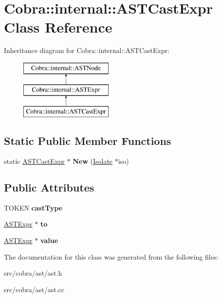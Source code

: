 \hypertarget{class_cobra_1_1internal_1_1_a_s_t_cast_expr}{\section{Cobra\+:\+:internal\+:\+:A\+S\+T\+Cast\+Expr Class Reference}
\label{class_cobra_1_1internal_1_1_a_s_t_cast_expr}
}
Inheritance diagram for Cobra\+:\+:internal\+:\+:A\+S\+T\+Cast\+Expr\+:\begin{figure}[H]
\begin{center}
\leavevmode
\includegraphics[height=3.000000cm]{class_cobra_1_1internal_1_1_a_s_t_cast_expr}
\end{center}
\end{figure}
\subsection*{Static Public Member Functions}
\begin{DoxyCompactItemize}
\item 
\hypertarget{class_cobra_1_1internal_1_1_a_s_t_cast_expr_ae37ff4d3a4bdd6c16a9bde34b163971d}{static \hyperlink{class_cobra_1_1internal_1_1_a_s_t_cast_expr}{A\+S\+T\+Cast\+Expr} $\ast$ {\bfseries New} (\hyperlink{class_cobra_1_1internal_1_1_isolate}{Isolate} $\ast$iso)}\label{class_cobra_1_1internal_1_1_a_s_t_cast_expr_ae37ff4d3a4bdd6c16a9bde34b163971d}

\end{DoxyCompactItemize}
\subsection*{Public Attributes}
\begin{DoxyCompactItemize}
\item 
\hypertarget{class_cobra_1_1internal_1_1_a_s_t_cast_expr_ae1c831b39b5f0280e17896784dc419fa}{T\+O\+K\+E\+N {\bfseries cast\+Type}}\label{class_cobra_1_1internal_1_1_a_s_t_cast_expr_ae1c831b39b5f0280e17896784dc419fa}

\item 
\hypertarget{class_cobra_1_1internal_1_1_a_s_t_cast_expr_a65dd03166f5fa966c3c9d18fe78a30e3}{\hyperlink{class_cobra_1_1internal_1_1_a_s_t_expr}{A\+S\+T\+Expr} $\ast$ {\bfseries to}}\label{class_cobra_1_1internal_1_1_a_s_t_cast_expr_a65dd03166f5fa966c3c9d18fe78a30e3}

\item 
\hypertarget{class_cobra_1_1internal_1_1_a_s_t_cast_expr_ad3b58a028bdb1241fe1eb98b306fd9cb}{\hyperlink{class_cobra_1_1internal_1_1_a_s_t_expr}{A\+S\+T\+Expr} $\ast$ {\bfseries value}}\label{class_cobra_1_1internal_1_1_a_s_t_cast_expr_ad3b58a028bdb1241fe1eb98b306fd9cb}

\end{DoxyCompactItemize}


The documentation for this class was generated from the following files\+:\begin{DoxyCompactItemize}
\item 
src/cobra/ast/ast.\+h\item 
src/cobra/ast/ast.\+cc\end{DoxyCompactItemize}
